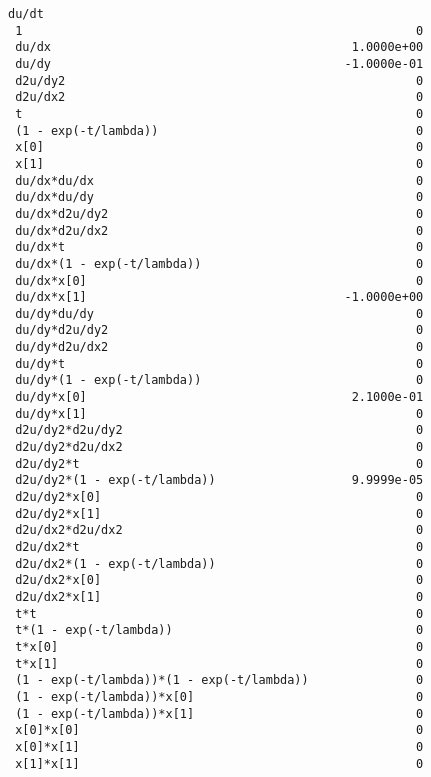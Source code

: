 \documentclass{article}
\begin{document}
\begin{lstlisting}[language={}]
                                                    du/dt
 1                                                       0
 du/dx                                          1.0000e+00
 du/dy                                         -1.0000e-01
 d2u/dy2                                                 0
 d2u/dx2                                                 0
 t                                                       0
 (1 - exp(-t/lambda))                                    0
 x[0]                                                    0
 x[1]                                                    0
 du/dx*du/dx                                             0
 du/dx*du/dy                                             0
 du/dx*d2u/dy2                                           0
 du/dx*d2u/dx2                                           0
 du/dx*t                                                 0
 du/dx*(1 - exp(-t/lambda))                              0
 du/dx*x[0]                                              0
 du/dx*x[1]                                    -1.0000e+00
 du/dy*du/dy                                             0
 du/dy*d2u/dy2                                           0
 du/dy*d2u/dx2                                           0
 du/dy*t                                                 0
 du/dy*(1 - exp(-t/lambda))                              0
 du/dy*x[0]                                     2.1000e-01
 du/dy*x[1]                                              0
 d2u/dy2*d2u/dy2                                         0
 d2u/dy2*d2u/dx2                                         0
 d2u/dy2*t                                               0
 d2u/dy2*(1 - exp(-t/lambda))                   9.9999e-05
 d2u/dy2*x[0]                                            0
 d2u/dy2*x[1]                                            0
 d2u/dx2*d2u/dx2                                         0
 d2u/dx2*t                                               0
 d2u/dx2*(1 - exp(-t/lambda))                            0
 d2u/dx2*x[0]                                            0
 d2u/dx2*x[1]                                            0
 t*t                                                     0
 t*(1 - exp(-t/lambda))                                  0
 t*x[0]                                                  0
 t*x[1]                                                  0
 (1 - exp(-t/lambda))*(1 - exp(-t/lambda))               0
 (1 - exp(-t/lambda))*x[0]                               0
 (1 - exp(-t/lambda))*x[1]                               0
 x[0]*x[0]                                               0
 x[0]*x[1]                                               0
 x[1]*x[1]                                               0
\end{lstlisting}
\end{document}
